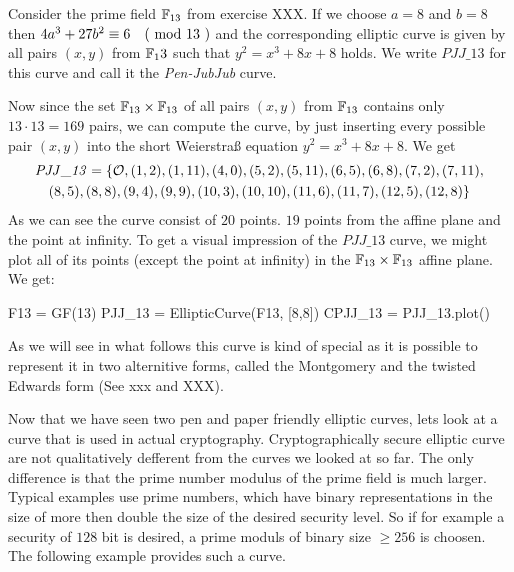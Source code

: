 \begin{example} Consider the prime field $\mathbb{F}_{13}$ from exercise XXX. If we choose $a=8$ and $b=8$ then $4a^3+ 27b^2 \equiv 6 \quad \text{( mod } 13 \text{ )}$ and the corresponding elliptic curve is given by all pairs $(x,y)$ from $\mathbb{F}_13$ such that $y^2=x^3+8x+8$ holds. We write $\mathit{PJJ\_13}$ for this curve and call it the \textit{Pen-JubJub} curve.

Now since the set $\mathbb{F}_{13}\times \mathbb{F}_{13}$ of all pairs $(x,y)$ from $\mathbb{F}_{13}$ contains only $13\cdot 13=169$ pairs, we can compute the curve, by just inserting every possible pair $(x,y)$ into the short Weierstraß equation $y^2 = x^3 +8x +8$.  We get 
\begin{multline*}
\mathit{PJJ\_13} = \{\mathcal{O}, (1, 2), (1, 11), (4, 0), (5, 2), (5, 11), (6, 5), (6, 8), (7,2), (7, 11), \\ (8, 5), (8, 8), (9, 4), (9, 9), (10, 3), (10,
10), (11, 6), (11, 7), (12, 5), (12, 8)\}
\end{multline*}
As we can see the curve consist of $20$ points. $19$ points from the affine plane and the point at infinity.
To get a visual impression of the $\mathit{PJJ\_13}$ curve, we might plot all of its points (except the point at infinity) in the $\mathbb{F}_{13}\times \mathbb{F}_{13}$ affine plane. We get: 
\begin{sagesilent}
F13 = GF(13)
PJJ_13 = EllipticCurve(F13, [8,8])
CPJJ_13 = PJJ_13.plot()
\end{sagesilent}
\begin{center} 
\end{center}
As we will see in what follows this curve is kind of special as it is possible to represent it in two alternitive forms, called the Montgomery and the twisted Edwards form (See xxx and XXX).
\end{example}
Now that we have seen two pen and paper friendly elliptic curves, lets look at a curve that is used in actual cryptography. Cryptographically secure elliptic curve are not qualitatively defferent from the curves we looked at so far. The only difference is that the prime number modulus of the prime field is much larger. Typical examples use prime numbers, which have binary representations in the size of more then double the size of the desired security level. So if for example a security of $128$ bit is desired, a prime moduls of binary size $\geq 256$ is choosen. The following example provides such a curve. 
